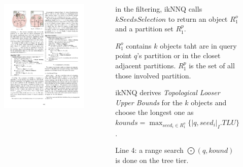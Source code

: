 \begin{frame}
\begin{columns}[c]

  \begin{figure}[tb]
    \includegraphics[width=\columnwidth]{figures/2-6/2-6-16.pdf}
  \end{figure}

  \begin{sitemize}
    \item in the filtering, ikNNQ calls $kSeedsSelection$ to return an object $R_1^o$ and a partition set $R_1^p$.
    \item $R_1^o$ contains $k$ objects taht are in query point $q$'s partition or in the closet adjacent partitions. $R_1^p$ is the set of all those involved partition.
    \item ikNNQ derives \emph{Topological Looser Upper Bounds} for the $k$ objects and choose the longest one as $kounds = \max_{seed_i \in R_1^o}\{ |q,seed_i|_I.TLU \}$.
    \item Line 4: a range search $\bigodot(q,kound)$ is done on the tree tier.
  \end{sitemize}

\end{columns}

\end{frame}

